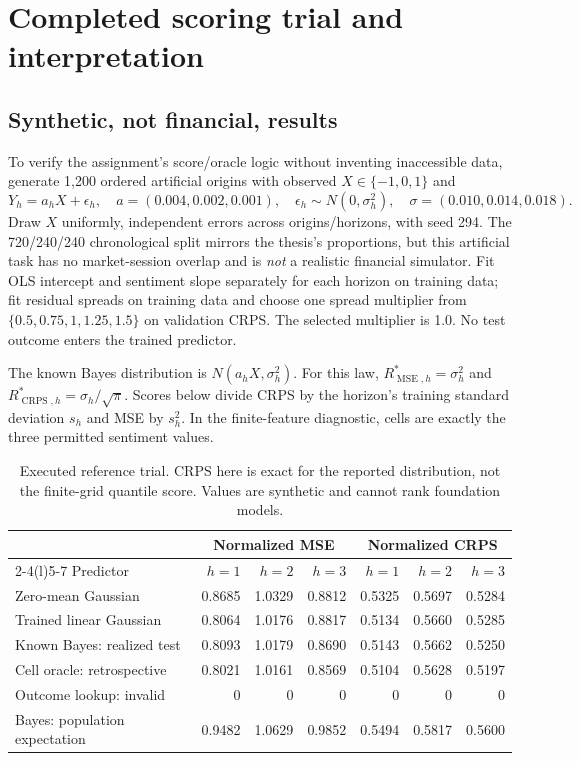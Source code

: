 \documentclass[11pt,letterpaper]{article}
\newcommand{\CRPS}{\operatorname{CRPS}}
\newcommand{\MSE}{\operatorname{MSE}}
\begin{document}
\section{Completed scoring trial and interpretation}
\subsection{Synthetic, not financial, results}
To verify the assignment's score/oracle logic without inventing inaccessible data, generate 1,200 ordered artificial origins with observed $X\in\{-1,0,1\}$ and
\begin{equation}
Y_h=a_hX+\epsilon_h,\quad
a=(0.004,0.002,0.001),\quad
\epsilon_h\sim N(0,\sigma_h^2),\quad
\sigma=(0.010,0.014,0.018).
\end{equation}
Draw $X$ uniformly, independent errors across origins/horizons, with seed 294. The 720/240/240 chronological split mirrors the thesis's proportions, but this artificial task has no market-session overlap and is \emph{not} a realistic financial simulator. Fit OLS intercept and sentiment slope separately for each horizon on training data; fit residual spreads on training data and choose one spread multiplier from $\{0.5,0.75,1,1.25,1.5\}$ on validation CRPS. The selected multiplier is 1.0. No test outcome enters the trained predictor.

The known Bayes distribution is $N(a_hX,\sigma_h^2)$. For this law,
$R^*_{\MSE,h}=\sigma_h^2$ and $R^*_{\CRPS,h}=\sigma_h/\sqrt{\pi}$.
Scores below divide CRPS by the horizon's training standard deviation $s_h$ and MSE by $s_h^2$. In the finite-feature diagnostic, cells are exactly the three permitted sentiment values.

\begin{table}[htbp]
\centering\small
\begin{tabular}{@{}lrrrrrr@{}}
\toprule
& \multicolumn{3}{c}{Normalized MSE} & \multicolumn{3}{c}{Normalized CRPS}\\
\cmidrule(lr){2-4}\cmidrule(l){5-7}
Predictor & $h=1$ & $h=2$ & $h=3$ & $h=1$ & $h=2$ & $h=3$\\
\midrule
Zero-mean Gaussian & 0.8685 & 1.0329 & 0.8812 & 0.5325 & 0.5697 & 0.5284\\
Trained linear Gaussian & 0.8064 & 1.0176 & 0.8817 & 0.5134 & 0.5660 & 0.5285\\
Known Bayes: realized test & 0.8093 & 1.0179 & 0.8690 & 0.5143 & 0.5662 & 0.5250\\
Cell oracle: retrospective & 0.8021 & 1.0161 & 0.8569 & 0.5104 & 0.5628 & 0.5197\\
Outcome lookup: invalid & 0 & 0 & 0 & 0 & 0 & 0\\
\midrule
Bayes: population expectation & 0.9482 & 1.0629 & 0.9852 & 0.5494 & 0.5817 & 0.5600\\
\bottomrule
\end{tabular}
\caption{Executed reference trial. CRPS here is exact for the reported distribution, not the finite-grid quantile score. Values are synthetic and cannot rank foundation models.}
\end{table}
\end{document}
